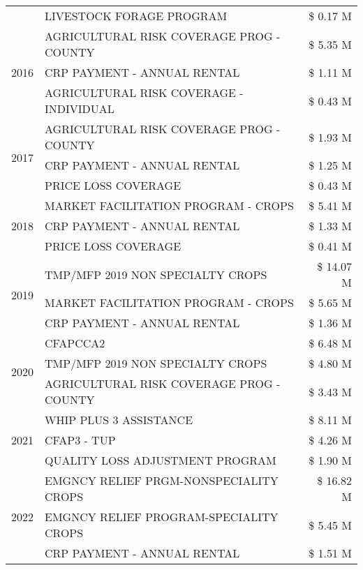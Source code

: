 \begin{tabular}{llr}
 & LIVESTOCK FORAGE PROGRAM & \$ 0.17 M \\
\cline{1-3}
\multirow[t]{3}{*}{2016} & AGRICULTURAL RISK COVERAGE PROG - COUNTY & \$ 5.35 M \\
 & CRP PAYMENT - ANNUAL RENTAL & \$ 1.11 M \\
 & AGRICULTURAL RISK COVERAGE - INDIVIDUAL & \$ 0.43 M \\
\cline{1-3}
\multirow[t]{3}{*}{2017} & AGRICULTURAL RISK COVERAGE PROG - COUNTY & \$ 1.93 M \\
 & CRP PAYMENT - ANNUAL RENTAL & \$ 1.25 M \\
 & PRICE LOSS COVERAGE & \$ 0.43 M \\
\cline{1-3}
\multirow[t]{3}{*}{2018} & MARKET FACILITATION PROGRAM - CROPS & \$ 5.41 M \\
 & CRP PAYMENT - ANNUAL RENTAL & \$ 1.33 M \\
 & PRICE LOSS COVERAGE & \$ 0.41 M \\
\cline{1-3}
\multirow[t]{3}{*}{2019} & TMP/MFP 2019 NON SPECIALTY CROPS & \$ 14.07 M \\
 & MARKET FACILITATION PROGRAM - CROPS & \$ 5.65 M \\
 & CRP PAYMENT - ANNUAL RENTAL & \$ 1.36 M \\
\cline{1-3}
\multirow[t]{3}{*}{2020} & CFAPCCA2 & \$ 6.48 M \\
 & TMP/MFP 2019 NON SPECIALTY CROPS & \$ 4.80 M \\
 & AGRICULTURAL RISK COVERAGE PROG - COUNTY & \$ 3.43 M \\
\cline{1-3}
\multirow[t]{3}{*}{2021} & WHIP PLUS 3 ASSISTANCE & \$ 8.11 M \\
 & CFAP3 - TUP & \$ 4.26 M \\
 & QUALITY LOSS ADJUSTMENT PROGRAM & \$ 1.90 M \\
\cline{1-3}
\multirow[t]{3}{*}{2022} & EMGNCY RELIEF PRGM-NONSPECIALITY CROPS & \$ 16.82 M \\
 & EMGNCY RELIEF PROGRAM-SPECIALITY CROPS & \$ 5.45 M \\
 & CRP PAYMENT - ANNUAL RENTAL & \$ 1.51 M \\
\cline{1-3}
\bottomrule
\end{tabular}
